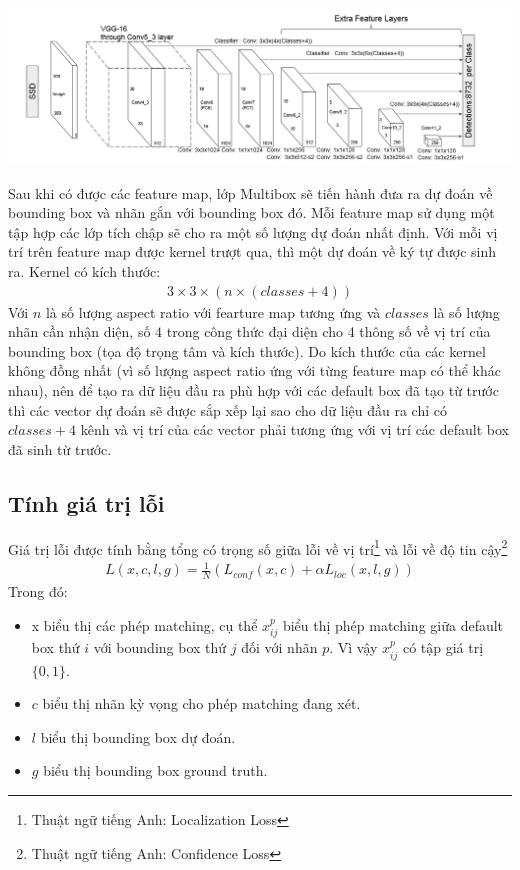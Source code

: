 \documentclass[a4paper]{article}
\theoremstyle{definition}
\begin{document}
	\begin{center}
		
		\centering
		\includegraphics[width=0.8\linewidth]{SSD_Struture.png}
		\vspace{0.5cm}
	\end{center}
	Sau khi có được các feature map, lớp Multibox sẽ tiến hành đưa ra dự đoán về bounding box và nhãn gắn với bounding box đó. Mỗi feature map sử dụng một tập hợp các lớp tích chập sẽ cho ra một số lượng dự đoán nhất định. Với mỗi vị trí trên feature map được kernel trượt qua, thì một dự đoán về ký tự được sinh ra. Kernel có kích thước:
	\begin{align}
	3 \times 3 \times (n \times (classes + 4))
	\end{align}
	Với $n$ là số lượng aspect ratio với fearture map tương ứng và $classes$ là số lượng nhãn cần nhận diện, số $4$ trong công thức đại diện cho 4 thông số về vị trí của bounding box (tọa độ trọng tâm và kích thước). Do kích thước của các kernel không đồng nhất (vì số lượng aspect ratio ứng với từng feature map có thể khác nhau), nên để tạo ra dữ liệu đầu ra phù hợp với các default box đã tạo từ trước thì các vector dự đoán sẽ được sắp xếp lại sao cho dữ liệu đầu ra chỉ có $classes + 4$ kênh và vị trí của các vector phải tương ứng với vị trí các default box đã sinh từ trước.
	
	\subsection{Tính giá trị lỗi}
	
	Giá trị lỗi được tính bằng tổng có trọng số giữa lỗi về vị trí\footnote{Thuật ngữ tiếng Anh: Localization Loss} và lỗi về độ tin cậy\footnote{Thuật ngữ tiếng Anh: Confidence Loss}
	\begin{align}
	L(x,c,l,g) = \frac{1}{N} (L_{conf}(x,c) + \alpha L_{loc}(x,l,g) )
	\end{align}
	Trong đó:
	\begin{itemize}
		\item x biểu thị các phép matching, cụ thể $x^p_{ij}$ biểu thị phép matching giữa default box thứ $i$ với bounding box thứ $j$ đối với nhãn $p$. Vì vậy $x^p_{ij}$ có tập giá trị $\{0, 1\}$.
		\item $c$ biểu thị nhãn kỳ vọng cho phép matching đang xét.
		\item $l$ biểu thị bounding box dự đoán.
		\item $g$ biểu thị bounding box ground truth.
	\end{itemize}
	
\end{document}
